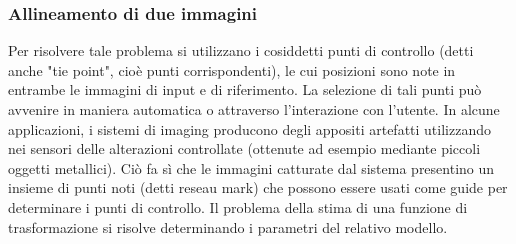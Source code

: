 \documentclass[12pt]{article}
\begin{document}
\subsubsection{Allineamento di due immagini}
Per risolvere tale problema si utilizzano i cosiddetti punti di controllo (detti anche "tie point", cioè punti corrispondenti), le cui posizioni sono note in entrambe le immagini di input e di riferimento. La selezione di tali punti può avvenire in maniera automatica o attraverso l'interazione con l'utente. In alcune applicazioni, i sistemi di imaging producono degli appositi artefatti utilizzando nei sensori delle alterazioni controllate (ottenute ad esempio mediante piccoli oggetti metallici). Ciò fa sì che le immagini catturate dal sistema presentino un insieme di punti noti (detti reseau mark) che possono essere usati come guide per determinare i punti di controllo. Il problema della stima di una funzione di trasformazione si risolve determinando i parametri del relativo modello.
\newpage
\end{document}
